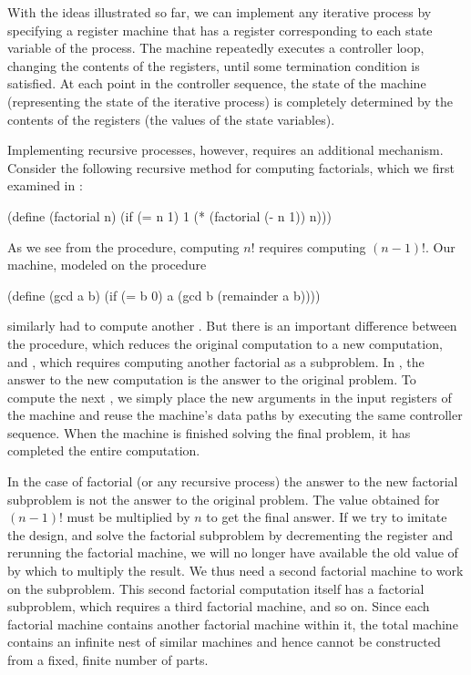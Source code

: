 With the ideas illustrated so far, we can implement any iterative process by
specifying a register machine that has a register corresponding to each state
variable of the process.  The machine repeatedly executes a controller loop,
changing the contents of the registers, until some termination condition is
satisfied.  At each point in the controller sequence, the state of the machine
(representing the state of the iterative process) is completely determined by
the contents of the registers (the values of the state variables).

Implementing recursive processes, however, requires an additional mechanism.
Consider the following recursive method for computing factorials, which we
first examined in :

\begin{codeBlock}
(define (factorial n)
  (if (= n 1) 1 (* (factorial (- n 1)) n)))
\end{codeBlock}

\noindent
As we see from the procedure, computing \( n! \) requires computing \( (n - 1)! \).
Our  machine, modeled on the procedure

\begin{codeBlock}
(define (gcd a b)
  (if (= b 0) a (gcd b (remainder a b))))
\end{codeBlock}

\noindent
similarly had to compute another .  But there is an important
difference between the  procedure, which reduces the original
computation to a new  computation, and , which
requires computing another factorial as a subproblem.  In , the
answer to the new  computation is the answer to the original
problem.  To compute the next , we simply place the new arguments
in the input registers of the  machine and reuse the machine's
data paths by executing the same controller sequence.  When the machine is
finished solving the final  problem, it has completed the entire
computation.

In the case of factorial (or any recursive process) the answer to the new
factorial subproblem is not the answer to the original problem.  The value
obtained for \( (n - 1)! \) must be multiplied by \( n \) to get the final answer.
If we try to imitate the  design, and solve the factorial
subproblem by decrementing the  register and rerunning the factorial
machine, we will no longer have available the old value of  by which to
multiply the result.  We thus need a second factorial machine to work on the
subproblem.  This second factorial computation itself has a factorial
subproblem, which requires a third factorial machine, and so on.  Since each
factorial machine contains another factorial machine within it, the total
machine contains an infinite nest of similar machines and hence cannot be
constructed from a fixed, finite number of parts.

